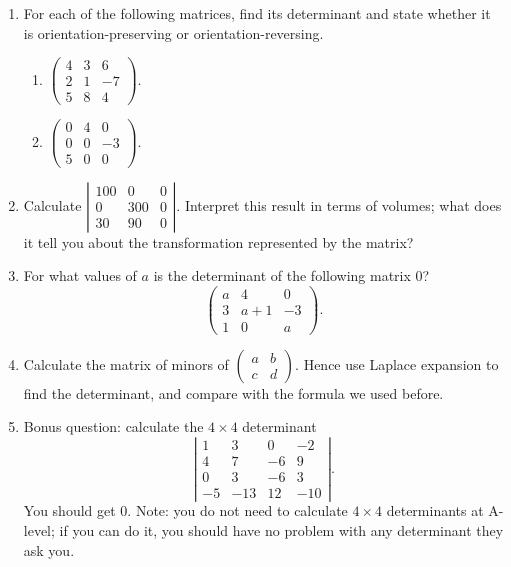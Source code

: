 \documentclass{article}
\begin{document}
\begin{enumerate}
	\item For each of the following matrices, find its determinant and state whether it is orientation-preserving or orientation-reversing.
		\begin{enumerate}
			\item $\left(\begin{array}{ccc}4&3&6\\2&1&-7\\5&8&4\end{array}\right)$.
			\item $\left(\begin{array}{ccc}0&4&0\\0&0&-3\\5&0&0\end{array}\right)$.
		\end{enumerate}
	\item Calculate $\left|\begin{array}{ccc}100&0&0\\0&300&0\\30&90&0\end{array}\right|$. Interpret this result in terms of volumes; what does it tell you about the transformation represented by the matrix?
	\item For what values of $a$ is the determinant of the following matrix 0?
		\[\left(\begin{array}{ccc}a&4&0\\3&a+1&-3\\1&0&a\end{array}\right).\]
	\item Calculate the matrix of minors of $\left(\begin{array}{cc}a&b\\c&d\end{array}\right)$. Hence use Laplace expansion to find the determinant, and compare with the formula we used before.
	\item Bonus question: calculate the $4\times 4$ determinant
		\[\left|\begin{array}{cccc}1&3&0&-2\\4&7&-6&9\\0&3&-6&3\\-5&-13&12&-10\end{array}\right|.\]
		You should get 0. Note: you do not need to calculate $4\times 4$ determinants at A-level; if you can do it, you should have no problem with any determinant they ask you.
\end{enumerate}
\end{document}
